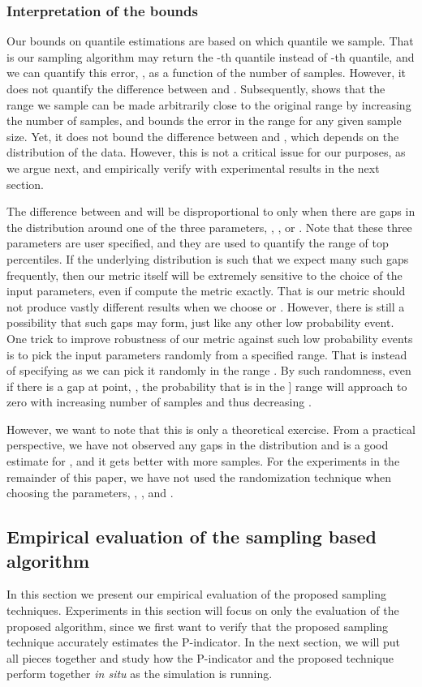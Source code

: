 \documentclass[final]{siamltex}
\newcommand{\pmetric}{P}
\begin{document}
\subsubsection{Interpretation of the bounds}
Our bounds on  quantile estimations are based on which quantile we sample.  That
is our sampling algorithm may return the -th quantile  instead of
-th quantile, and we can quantify this error, , as a function of
the number of samples.  However, it does not quantify  the difference between
  and  .
Subsequently,  shows that the range we sample can be made
arbitrarily close to the original range by increasing the number of samples,
and  bounds the error in the range for any given sample size. Yet, it does not bound the difference between  and , which depends on the distribution of the data.  However,  this is not a critical issue for our purposes, as we argue next, and empirically verify with experimental results in the next section.  

The difference between  and  will be disproportional to  only when there are gaps in the distribution around one of the three parameters,  , , or .  Note that these three parameters are user specified, and they are used to quantify the range of top percentiles. If the underlying distribution is such that we expect many such gaps frequently,  then  our  metric itself  will be extremely sensitive to the choice of  the input parameters, even if compute the metric exactly. That is our metric should not produce vastly different  results when we choose   or .  However, there is  still a possibility that such gaps  may form, just like any other  low probability event.  One trick to  improve robustness of our metric against such low probability events is to pick the  input parameters randomly from a specified range.  That is instead of specifying  as  we can pick it randomly in the range .  By such randomness, even if there is a gap at point, , the probability that  is in the ] range will approach to zero with increasing number of  samples and thus decreasing .    
  
However, we want to note that this is only a theoretical exercise. 
From a practical perspective, we have not observed  any  gaps in the distribution and  is a good estimate for , and it gets better with more samples.  For the  experiments in the remainder of this  paper, we have not  used  the randomization technique when choosing the parameters, , , and .  

\subsection{Empirical  evaluation of the sampling based  algorithm}
In this section we present our empirical evaluation of the proposed  sampling
techniques.  Experiments  in this section  will focus on only the  evaluation
of  the proposed algorithm,  since we first want to verify  that the proposed
sampling  technique accurately estimates the \pmetric-indicator. In the next
section, we will put all pieces together  and study how  the
\pmetric-indicator and  the proposed technique perform together \emph{in situ}
as the simulation is running.
\end{document}

